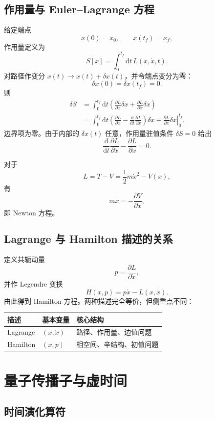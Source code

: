 \documentclass[11pt,a4paper,oneside,openany,fontset=fandol]{ctexbook}
\newcommand{\dd}{\mathrm{d}}
\begin{document}
\section{作用量与 Euler--Lagrange 方程}

给定端点
\[
x(0)=x_0,\qquad x(t_f)=x_f,
\]
作用量定义为
\[
S[x]
=
\int_0^{t_f}\dd t\,L(x,\dot x,t).
\]
对路径作变分 $x(t)\to x(t)+\delta x(t)$，并令端点变分为零：
\[
\delta x(0)=\delta x(t_f)=0.
\]
则
\begin{align}
\delta S
&=
\int_0^{t_f}\dd t
\left(
\frac{\partial L}{\partial x}\delta x
+
\frac{\partial L}{\partial\dot x}\delta\dot x
\right)\\
&=
\int_0^{t_f}\dd t
\left(
\frac{\partial L}{\partial x}
-
\frac{\dd}{\dd t}
\frac{\partial L}{\partial\dot x}
\right)\delta x
+
\left.
\frac{\partial L}{\partial\dot x}\delta x
\right|_0^{t_f}.
\end{align}
边界项为零。由于内部的 $\delta x(t)$ 任意，作用量驻值条件 $\delta S=0$ 给出
\[
\boxed{
\frac{\dd}{\dd t}
\frac{\partial L}{\partial\dot x}
-
\frac{\partial L}{\partial x}
=0
}.
\]

对于
\[
L=T-V=\frac12m\dot x^2-V(x),
\]
有
\[
m\ddot x=-\frac{\partial V}{\partial x},
\]
即 Newton 方程。

\section{Lagrange 与 Hamilton 描述的关系}

定义共轭动量
\[
p=\frac{\partial L}{\partial\dot x},
\]
并作 Legendre 变换
\[
H(x,p)=p\dot x-L(x,\dot x).
\]
由此得到 Hamilton 方程。两种描述完全等价，但侧重点不同：

\begin{center}
\begin{tabular}{lll}
\toprule
描述 & 基本变量 & 核心结构\\
\midrule
Lagrange & $(x,\dot x)$ & 路径、作用量、边值问题\\
Hamilton & $(x,p)$ & 相空间、辛结构、初值问题\\
\bottomrule
\end{tabular}
\end{center}

\chapter{量子传播子与虚时间}

\section{时间演化算符}
\end{document}
